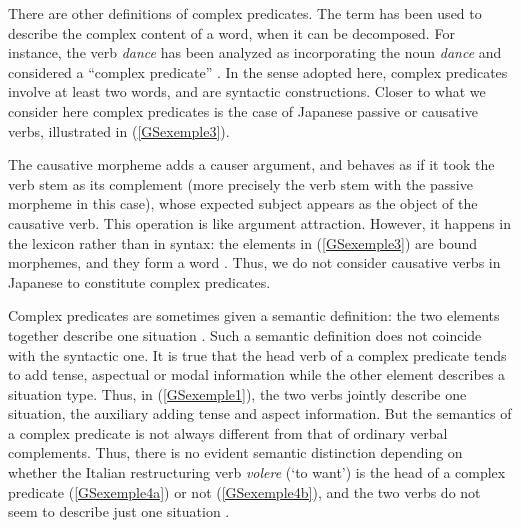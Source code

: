 \documentclass[output=paper
                ,modfonts
                ,nonflat
	        ,collection
	        ,collectionchapter
	        ,collectiontoclongg
 	        ,biblatex
                ,babelshorthands
                ,newtxmath
                ,draftmode
                ,colorlinks, citecolor=brown
]{./langsci/langscibook}
\begin{document}
{There are other definitions of complex predicates. The term has been used to describe the complex content of a word, when it can be decomposed. For instance, the verb \emph{dance} has been analyzed as incorporating the noun \emph{dance} and considered a ``complex predicate'' \citep{HK97a-u}. In the sense adopted here, complex predicates involve at least two words, and are syntactic constructions. Closer to what we consider here complex predicates is the case of Japanese passive or causative verbs, illustrated in (\ref{GSexemple3}).

\z

The causative morpheme adds a causer argument, and behaves as if it took the verb stem as its complement (more precisely the verb stem with the passive morpheme in this case), whose expected subject appears as the object of the causative verb. This operation is like argument attraction. However, it happens in the lexicon rather than in syntax: the elements in (\ref{GSexemple3}) are bound morphemes, and they form a word \citep{manning1999lexical, gunji2012topics}. Thus, we do not consider causative verbs in Japanese to constitute complex predicates.

Complex predicates are sometimes given a semantic definition: the two elements together describe one situation \citep{butt1995structure}. Such a semantic definition does not coincide with the syntactic one. It is true that the head verb of a complex predicate tends to add tense, aspectual or modal information while the other element describes a situation type. Thus, in (\ref{GSexemple1}), the two verbs jointly describe one situation, the auxiliary adding tense and aspect information. But the semantics of a complex predicate is not always different from that of ordinary verbal complements. Thus, there is no evident semantic distinction depending on whether the Italian restructuring verb \emph{volere} (`to want') is the head of a complex predicate (\ref{GSexemple4a}) or not (\ref{GSexemple4b}), and the two verbs do not seem to describe just one situation \citep{Monachesi98a}.  

\eal 
	\label{GSexemple4} 
	\label{GSexemple4a}
		
}
\end{document}
